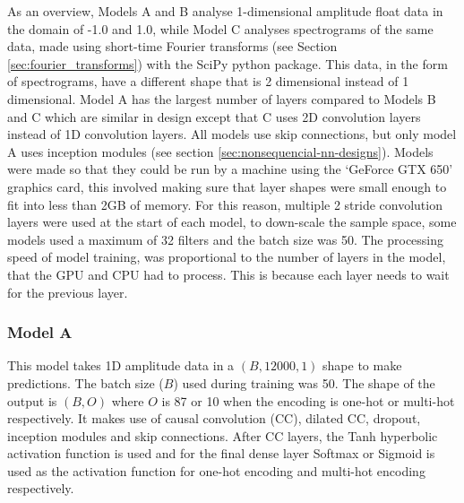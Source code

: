 \documentclass[12pt]{article}
\begin{document}
    As an overview, Models A and B analyse 1-dimensional amplitude float data in the domain of -1.0 and 1.0, while Model C analyses spectrograms of the same data, made using short-time Fourier transforms (see Section \ref{sec:fourier_transforms}) with the SciPy python package. This data, in the form of spectrograms, have a different shape that is 2 dimensional instead of 1 dimensional. Model A has the largest number of layers compared to Models B and C which are similar in design except that C uses 2D convolution layers instead of 1D convolution layers. All models use skip connections, but only model A uses inception modules (see section \ref{sec:nonsequencial-nn-designs}). Models were made so that they could be run by a machine using the `GeForce GTX 650' graphics card, this involved making sure that layer shapes were small enough to fit into less than 2GB of memory. For this reason, multiple 2 stride convolution layers were used at the start of each model, to down-scale the sample space, some models used a maximum of 32 filters and the batch size was 50. The processing speed of model training, was proportional to the number of layers in the model, that the GPU and CPU had to process. This is because each layer needs to wait for the previous layer. 
    
    \subsubsection{Model A}
    \label{sec:design_modelA}
    
    This model takes 1D amplitude data in a $(B, 12000, 1)$ shape to make predictions. The batch size ($B$) used during training was 50. The shape of the output is $(B, O)$ where $O$ is 87 or 10 when the encoding is one-hot or multi-hot respectively. It makes use of causal convolution (CC), dilated CC, dropout, inception modules and skip connections. After CC layers, the Tanh hyperbolic activation function is used and for the final dense layer Softmax or Sigmoid is used as the activation function for one-hot encoding and multi-hot encoding respectively.\medskip
\end{document}
